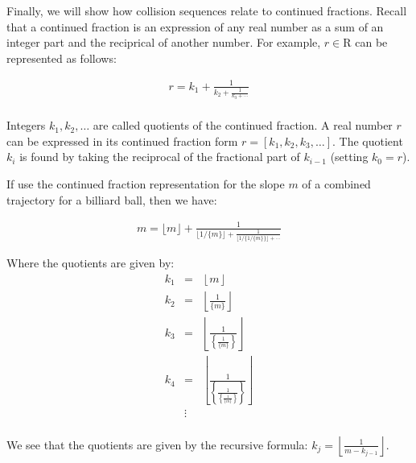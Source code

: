 Finally, we will show how collision sequences relate to continued fractions. Recall that a continued fraction is an expression of any real number as a sum of an integer part and the reciprical of another number. For example, $r \in \mathrm{R}$ can be represented as follows:

\begin{eqnarray}
r = k_1 + \frac{1}{k_2 + \frac{1}{k_3 + \cdots}} \\
\end{eqnarray}

Integers $k_1, k_2, \ldots$ are called quotients of the continued fraction. A real number $r$ can be expressed in its continued fraction form $r = [k_1, k_2, k_3, \ldots]$. The quotient $k_i$ is found by taking the reciprocal of the fractional part of $k_{i-1}$ (setting $k_0 = r$).

If use the continued fraction representation for the slope $m$ of a combined trajectory for a billiard ball, then we have:

\begin{eqnarray}
m = \lfloor m \rfloor + \frac{1}{\lfloor 1 / \{m\} \rfloor + \frac{1}{\lfloor 1/\{1/\{m\}\} \rfloor + \cdots}}
\end{eqnarray}

Where the quotients are given by:
\begin{eqnarray}
  k_1 &=& \left\lfloor m \right\rfloor \\
  k_2 &=& \left\lfloor \frac{1}{\{m\}} \right\rfloor \\
  k_3 &=& \left\lfloor \frac{1}{\left\{ \frac{1}{\{m\}} \right\}} \right\rfloor \\
  k_4 &=& \left\lfloor \frac{1}{\left\{ \frac{1}{\left\{\frac{1}{\{m\}}\right\}} \right\}} \right\rfloor \\
      &\vdots& \\
\end{eqnarray}

We see that the quotients are given by the recursive formula: $k_j = \left\lfloor \frac{1}{m - k_{j-1}} \right\rfloor$.

